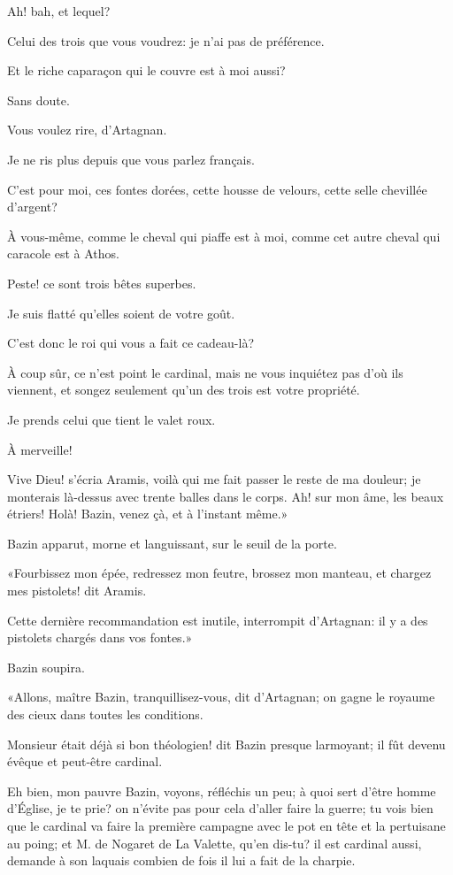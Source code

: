 \speak  Ah! bah, et lequel? 

\speak  Celui des trois que vous voudrez: je n'ai pas de préférence. 

\speak  Et le riche caparaçon qui le couvre est à moi aussi? 

\speak  Sans doute. 

\speak  Vous voulez rire, d'Artagnan. 

\speak  Je ne ris plus depuis que vous parlez français. 

\speak  C'est pour moi, ces fontes dorées, cette housse de velours, cette selle chevillée d'argent? 

\speak  À vous-même, comme le cheval qui piaffe est à moi, comme cet autre cheval qui caracole est à Athos. 

\speak  Peste! ce sont trois bêtes superbes. 

\speak  Je suis flatté qu'elles soient de votre goût. 

\speak  C'est donc le roi qui vous a fait ce cadeau-là? 

\speak  À coup sûr, ce n'est point le cardinal, mais ne vous inquiétez pas d'où ils viennent, et songez seulement qu'un des trois est votre propriété. 

\speak  Je prends celui que tient le valet roux. 

\speak  À merveille! 

\speak  Vive Dieu! s'écria Aramis, voilà qui me fait passer le reste de ma douleur; je monterais là-dessus avec trente balles dans le corps. Ah! sur mon âme, les beaux étriers! Holà! Bazin, venez çà, et à l'instant même.» 

Bazin apparut, morne et languissant, sur le seuil de la porte. 

«Fourbissez mon épée, redressez mon feutre, brossez mon manteau, et chargez mes pistolets! dit Aramis. 

\speak  Cette dernière recommandation est inutile, interrompit d'Artagnan: il y a des pistolets chargés dans vos fontes.» 

Bazin soupira. 

«Allons, maître Bazin, tranquillisez-vous, dit d'Artagnan; on gagne le royaume des cieux dans toutes les conditions. 

\speak  Monsieur était déjà si bon théologien! dit Bazin presque larmoyant; il fût devenu évêque et peut-être cardinal. 

\speak  Eh bien, mon pauvre Bazin, voyons, réfléchis un peu; à quoi sert d'être homme d'Église, je te prie? on n'évite pas pour cela d'aller faire la guerre; tu vois bien que le cardinal va faire la première campagne avec le pot en tête et la pertuisane au poing; et M. de Nogaret de La Valette, qu'en dis-tu? il est cardinal aussi, demande à son laquais combien de fois il lui a fait de la charpie. 

